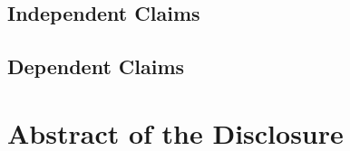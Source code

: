 \documentclass[12pt]{article}
\begin{document}
\subsection{Independent Claims}

\subsection{Dependent Claims}

\section{Abstract of the Disclosure}
\end{document}
